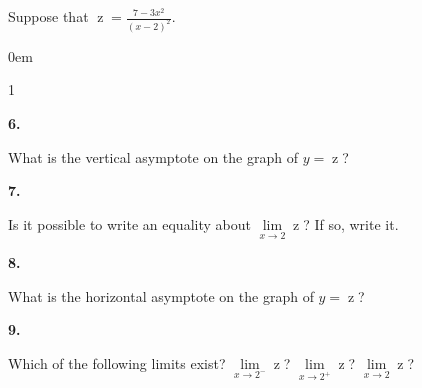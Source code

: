 \documentclass[12pt,]{book}
\theoremstyle{plain}
\theoremstyle{definition}
\numberwithin{equation}{section}
\newenvironment{exercisegroup}%
{\medskip\noindent}%
{\par\bigskip}%
\newlength{\exercisegroupindent}%
\newlength{\exercisegroupitemwidth}%
\newenvironment{exercisegrouplist}%
{\vspace{-\partopsep}%
\begin{adjustwidth}{\exercisegroupindent}{0em}}%
{\end{adjustwidth}%
\vspace{-\partopsep}%
\vspace{\baselineskip}}%
\newenvironment{exercisegroupbycol}[1]%
{\begin{exercisegrouplist}%
\vspace{-\multicolsep}%
\begin{multicols}{#1}%
\setlength{\parindent}{0em}%
\setlength{\exercisegroupitemwidth}{\linewidth}}%
{\end{multicols}%
\vspace{-\multicolsep}%
\end{exercisegrouplist}}%
\newenvironment{exercisegroupitem}[1]%
{\begin{minipage}[t]{\exercisegroupitemwidth}
\vspace{0pt}%
{\bfseries#1}%
\rule{0pt}{\baselineskip}}{\strut%
\end{minipage}%
\hspace{\columnsep}}%
\providecommand\phantomsection{}
\newcommand{\fe}[2]{\mathop{{#1}{\left(#2\right)}}}
\begin{document}
\begin{exercisegroup}%
Suppose that \(\fe{z}{x}=\frac{7-3x^2}{\left(x-2\right)^2}\).%
\begin{exercisegroupbycol}{1}%
\begin{exercisegroupitem}{6. }\phantomsection\hypertarget{exercise-79}{\null}
What is the vertical asymptote on the graph of \(y=\fe{z}{x}\)?%
\end{exercisegroupitem}%
\par%
\begin{exercisegroupitem}{7. }\phantomsection\hypertarget{exercise-80}{\null}
Is it possible to write an equality about \(\lim\limits_{x\to2}\fe{z}{x}\)? If so, write it.%
\end{exercisegroupitem}%
\par%
\begin{exercisegroupitem}{8. }\phantomsection\hypertarget{exercise-81}{\null}
What is the horizontal asymptote on the graph of \(y=\fe{z}{x}\)?%
\end{exercisegroupitem}%
\par%
\begin{exercisegroupitem}{9. }\phantomsection\hypertarget{exercise-82}{\null}
Which of the following limits exist? \(\lim\limits_{x\to2^{-}}\fe{z}{x}\)? \(\lim\limits_{x\to2^{+}}\fe{z}{x}\)? \(\lim\limits_{x\to2}\fe{z}{x}\)?%
\end{exercisegroupitem}%
\par%
\end{exercisegroupbycol}%
\end{exercisegroup}%
\end{document}
